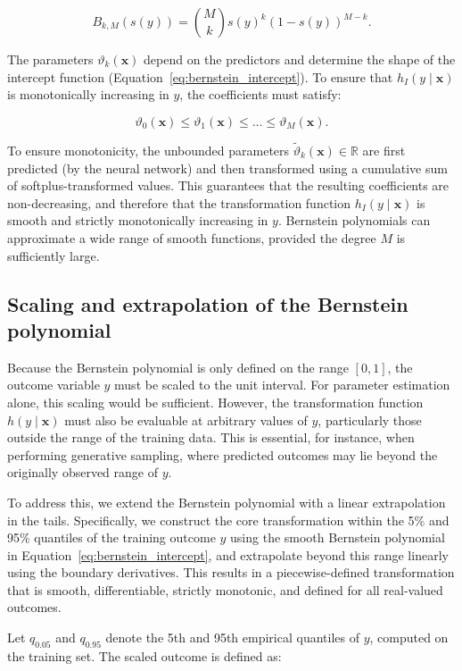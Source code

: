 \[
B_{k, M}(s(y)) = \binom{M}{k} s(y)^k (1 - s(y))^{M - k}.
\]

The parameters $\vartheta_k(\mathbf{x})$ depend on the predictors and determine the shape of the intercept function (Equation~\ref{eq:bernstein_intercept}). To ensure that $h_I(y \mid \mathbf{x})$ is monotonically increasing in $y$, the coefficients must satisfy:

\[
\vartheta_0(\mathbf{x}) \leq \vartheta_1(\mathbf{x}) \leq \dots \leq \vartheta_M(\mathbf{x}).
\]

To ensure monotonicity, the unbounded parameters $\tilde{\vartheta}_k(\mathbf{x}) \in \mathbb{R}$ are first predicted (by the neural network) and then transformed using a cumulative sum of softplus-transformed values. This guarantees that the resulting coefficients are non-decreasing, and therefore that the transformation function $h_I(y \mid \mathbf{x})$ is smooth and strictly monotonically increasing in $y$.
Bernstein polynomials can approximate a wide range of smooth functions, provided the degree $M$ is sufficiently large.



\subsection{Scaling and extrapolation of the Bernstein polynomial}

Because the Bernstein polynomial is only defined on the range $[0, 1]$, the outcome variable $y$ must be scaled to the unit interval. For parameter estimation alone, this scaling would be sufficient. However, the transformation function $h(y \mid \mathbf{x})$ must also be evaluable at arbitrary values of $y$, particularly those outside the range of the training data. This is essential, for instance, when performing generative sampling, where predicted outcomes may lie beyond the originally observed range of $y$.

To address this, we extend the Bernstein polynomial with a linear extrapolation in the tails. Specifically, we construct the core transformation within the 5\% and 95\% quantiles of the training outcome $y$ using the smooth Bernstein polynomial in Equation~\ref{eq:bernstein_intercept}, and extrapolate beyond this range linearly using the boundary derivatives. This results in a piecewise-defined transformation that is smooth, differentiable, strictly monotonic, and defined for all real-valued outcomes.

Let $q_{0.05}$ and $q_{0.95}$ denote the 5th and 95th empirical quantiles of $y$, computed on the training set. The scaled outcome is defined as:

